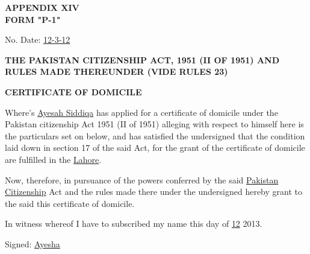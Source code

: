 \documentclass{article}
\begin{document}
\begin{center}
\textbf{APPENDIX XIV} \\
\textbf{FORM "P-1"}
\end{center}

\vspace{0.5cm}

No. \hspace{5cm} Date: \underline{\hspace{1cm}12-3-12\hspace{1cm}}

\vspace{0.5cm}

\textbf{THE PAKISTAN CITIZENSHIP ACT, 1951 (II OF 1951) AND RULES MADE THEREUNDER (VIDE RULES 23)}

\vspace{0.5cm}

\hrulefill
\begin{center}
\textbf{CERTIFICATE OF DOMICILE}
\end{center}
\hrulefill

\vspace{0.5cm}

Where's \underline{\hspace{1cm}Ayesah Siddiqa\hspace{1cm}} has applied for a certificate of domicile under the Pakistan citizenship Act 1951 (II of 1951) alleging with respect to himself here is the particulars set on below, and has satisfied the undersigned that the condition laid down in section 17 of the said Act, for the grant of the certificate of domicile are fulfilled in the \underline{\hspace{1cm}Lahore\hspace{1cm}}.

Now, therefore, in pursuance of the powers conferred by the said \underline{\hspace{1cm}Pakistan Citizenship\hspace{1cm}} Act and the rules made there under the undersigned hereby grant to the said this certificate of domicile.

\vspace{0.5cm}

In witness whereof I have to subscribed my name this day of \underline{\hspace{1cm}12\hspace{1cm}} 2013.

\vspace{0.5cm}

Signed: \underline{\hspace{1cm}Ayesha\hspace{1cm}}
\end{document}

